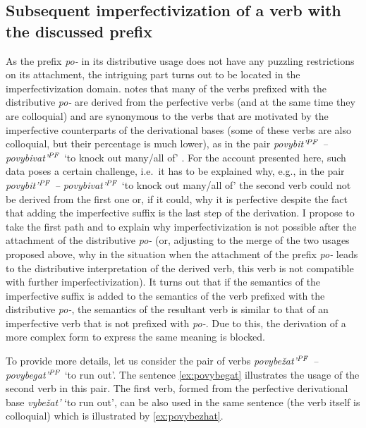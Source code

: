 \subsection{Subsequent imperfectivization of a verb with the discussed prefix}
As the prefix \textit{po-} in its distributive usage does not have any puzzling restrictions on its attachment, the intriguing part turns out to be located in the imperfectivization domain. \citet[365]{Shvedova:82} notes that many of the verbs prefixed with the distributive \textit{po-} are derived from the perfective verbs (and at the same time they are colloquial) and are synonymous to the verbs that are motivated by the imperfective counterparts of the derivational bases (some of these verbs are also colloquial, but their percentage is much lower), as in the pair \textit{povybit'$^{\mathit{PF}}$ -- povybivat'$^{\mathit{PF}}$} `to knock out many/all of'
.
For the account presented here, such data poses a certain challenge, i.e.\ it has to be explained why, e.g., in the pair \textit{povybit'$^{\mathit{PF}}$ -- povybivat'$^{\mathit{PF}}$} `to knock out many/all of' the second verb could not be derived from the first one or, if it could, why it is perfective despite the fact that adding the imperfective suffix is the last step of the derivation. I propose to take the first path and to explain why imperfectivization is not possible after the attachment of the distributive \textit{po-} (or, adjusting to the merge of the two usages proposed above, why in the situation when the attachment of the prefix \textit{po-} leads to the distributive interpretation of the derived verb, this verb is not compatible with further imperfectivization). It turns out that if the semantics of the imperfective suffix is added to the semantics of the verb prefixed with the distributive \textit{po-}, the semantics of the resultant verb is similar to that of an imperfective verb that is not prefixed with \textit{po-}. Due to this, the derivation of a more complex form to express the same meaning is blocked.

To provide more details, let us consider the pair of verbs \textit{povybe\v{z}at'$^{\mathit{PF}}$ -- povybegat'$^{\mathit{PF}}$} `to run out'. The sentence \ref{ex:povybegat} illustrates the usage of the second verb in this pair. The first verb, formed from the perfective derivational base \textit{vybe\v{z}at'} `to run out', can be also used in the same sentence (the verb itself is colloquial) which is illustrated by \ref{ex:povybezhat}.

